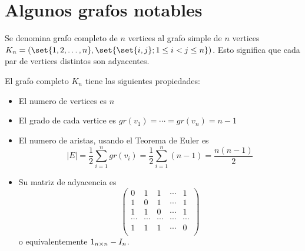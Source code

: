 \section{Algunos grafos notables}
\begin{definition}
	Se denomina grafo completo de \(n \) vertices al grafo simple de \(n \) vertices \(K_n = (\set{1,2,\ldots,n}, \set{\set{i,j}; 1 \leq i < j \leq n })\). Esto significa que cada par de vertices distintos son adyacentes.
\end{definition}

\begin{proposition}
	El grafo completo \(K_n \) tiene las siguientes propiedades:
	\begin{itemize}
		\item El numero de vertices es \(n \)
		\item El grado de cada vertice es \(gr(v_1) = \cdots = gr(v_n) = n - 1\)
		\item El numero de aristas, usando el Teorema de Euler es
		      \[
			      |E| = \frac{1}{2} \sum_{i=1}^{n } gr(v_i ) = \frac{1}{2} \sum_{i=1}^{n } (n-1) = \frac{n(n-1)}{2}
		      \]
		\item Su matriz de adyacencia es
		      \[
			      \begin{pmatrix}
				      0      & 1      & 1      & \cdots & 1      \\
				      1      & 0      & 1      & \cdots & 1      \\
				      1      & 1      & 0      & \cdots & 1      \\
				      \cdots & \cdots & \cdots & \cdots & \cdots \\
				      1      & 1      & 1      & \cdots & 0      \\
			      \end{pmatrix}
		      \]
		      o equivalentemente \({\large{1}_{n \times n}} - I_n\).
	\end{itemize}
\end{proposition}

